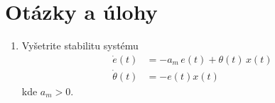 \documentclass[a4paper, 10pt, ]{article}
\begin{document}
\section{Otázky a úlohy}

\begin{enumerate}[leftmargin=0pt, labelsep=3mm, itemsep=0pt]

	\item Vyšetrite stabilitu systému
	\begin{align*}
		\dot{e}(t) &= -a_m\,e(t) + \theta(t) \, x(t)  \\
		\dot{\theta}(t) &= -e(t) x(t)
	\end{align*}
	kde $a_m > 0$.

\end{enumerate}
\end{document}
